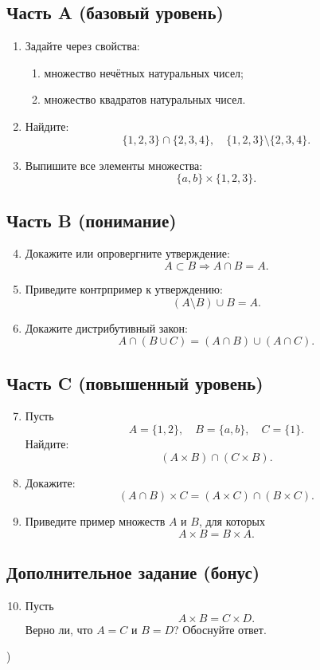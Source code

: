 \documentclass[12pt]{article}
\begin{document}
\bigskip

\subsection*{Часть A (базовый уровень)}

\begin{enumerate}
\item Задайте через свойства:
\begin{enumerate}
\item множество нечётных натуральных чисел;
\item множество квадратов натуральных чисел.
\end{enumerate}

\item Найдите:
\[
\{1,2,3\}\cap \{2,3,4\}, 
\quad
\{1,2,3\}\setminus \{2,3,4\}.
\]

\item Выпишите все элементы множества:
\[
\{a,b\}\times \{1,2,3\}.
\]
\end{enumerate}

\bigskip

\subsection*{Часть B (понимание)}

\begin{enumerate}
\setcounter{enumi}{3}

\item Докажите или опровергните утверждение:
\[
A\subset B \Rightarrow A\cap B = A.
\]

\item Приведите контрпример к утверждению:
\[
(A\setminus B)\cup B = A.
\]

\item Докажите дистрибутивный закон:
\[
A\cap (B\cup C) = (A\cap B)\cup (A\cap C).
\]
\end{enumerate}

\bigskip

\subsection*{Часть C (повышенный уровень)}

\begin{enumerate}
\setcounter{enumi}{6}

\item Пусть
\[
A=\{1,2\},\quad B=\{a,b\},\quad C=\{1\}.
\]
Найдите:
\[
(A\times B)\cap (C\times B).
\]

\item Докажите:
\[
(A\cap B)\times C = (A\times C)\cap (B\times C).
\]

\item Приведите пример множеств $A$ и $B$, для которых
\[
A\times B = B\times A.
\]
\end{enumerate}

\bigskip

\subsection*{Дополнительное задание (бонус)}

\begin{enumerate}
\setcounter{enumi}{9}

\item Пусть
\[
A\times B = C\times D.
\]
Верно ли, что $A=C$ и $B=D$? Обоснуйте ответ.
\end{enumerate})
\end{document}
